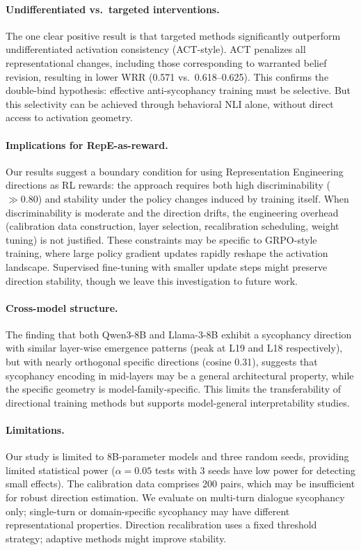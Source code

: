 \documentclass[11pt,a4paper]{article}
\begin{document}
\paragraph{Undifferentiated vs.\ targeted interventions.}
The one clear positive result is that targeted methods significantly outperform undifferentiated activation consistency (ACT-style). ACT penalizes all representational changes, including those corresponding to warranted belief revision, resulting in lower WRR (0.571 vs.\ 0.618--0.625). This confirms the double-bind hypothesis: effective anti-sycophancy training must be selective. But this selectivity can be achieved through behavioral NLI alone, without direct access to activation geometry.

\paragraph{Implications for RepE-as-reward.}
Our results suggest a boundary condition for using Representation Engineering directions as RL rewards: the approach requires both high discriminability ($\gg 0.80$) and stability under the policy changes induced by training itself. When discriminability is moderate and the direction drifts, the engineering overhead (calibration data construction, layer selection, recalibration scheduling, weight tuning) is not justified. These constraints may be specific to GRPO-style training, where large policy gradient updates rapidly reshape the activation landscape. Supervised fine-tuning with smaller update steps might preserve direction stability, though we leave this investigation to future work.

\paragraph{Cross-model structure.}
The finding that both Qwen3-8B and Llama-3-8B exhibit a sycophancy direction with similar layer-wise emergence patterns (peak at L19 and L18 respectively), but with nearly orthogonal specific directions (cosine 0.31), suggests that sycophancy encoding in mid-layers may be a general architectural property, while the specific geometry is model-family-specific. This limits the transferability of directional training methods but supports model-general interpretability studies.

\paragraph{Limitations.}
Our study is limited to 8B-parameter models and three random seeds, providing limited statistical power ($\alpha = 0.05$ tests with 3 seeds have low power for detecting small effects). The calibration data comprises 200 pairs, which may be insufficient for robust direction estimation. We evaluate on multi-turn dialogue sycophancy only; single-turn or domain-specific sycophancy may have different representational properties. Direction recalibration uses a fixed threshold strategy; adaptive methods might improve stability.
\end{document}
